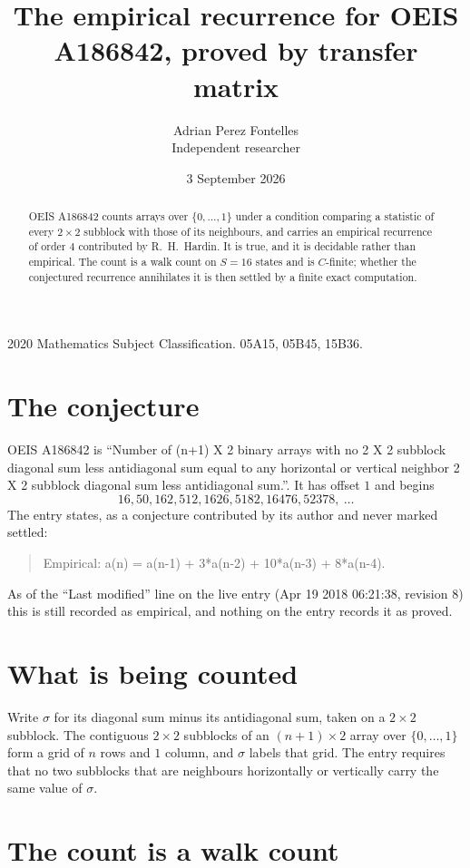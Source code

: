 \documentclass[11pt,a4paper]{article}
\title{The empirical recurrence for OEIS A186842, proved by transfer matrix}
\author{Adrian Perez Fontelles\\ \small Independent researcher}
\date{3 September 2026}
\theoremstyle{plain}
\theoremstyle{definition}
\begin{document}
\maketitle

\begin{abstract}
OEIS A186842 counts arrays over $\{0,\dots,1\}$ under a condition comparing a statistic of
every $2\times2$ subblock with those of its neighbours, and carries an empirical recurrence
of order $4$ contributed by R.~H.~Hardin. It is true, and it is decidable rather than
empirical. The count is a walk count on $S=16$ states and is $C$-finite; whether the
conjectured recurrence annihilates it is then settled by a finite exact computation.
\end{abstract}

\noindent\small 2020 Mathematics Subject Classification. 05A15, 05B45, 15B36.\normalsize

\section{The conjecture}

OEIS A186842 is ``Number of (n+1) X 2 binary arrays with no 2 X 2 subblock diagonal sum less antidiagonal sum equal to any horizontal or vertical neighbor 2 X 2 subblock diagonal sum less antidiagonal sum.''. It has offset $1$ and begins
\[
16, 50, 162, 512, 1626, 5182, 16476, 52378,\ \dots
\]
The entry states, as a conjecture contributed by its author and never marked settled:
\begin{quote}
Empirical: a(n) = a(n-1) + 3*a(n-2) + 10*a(n-3) + 8*a(n-4).
\end{quote}
As of the ``Last modified'' line on the live entry (Apr 19 2018 06:21:38, revision 8) this is still
recorded as empirical, and nothing on the entry records it as proved.

\section{What is being counted}

Write $\sigma$ for its diagonal sum minus its antidiagonal sum, taken on a $2\times2$ subblock. The contiguous $2\times2$
subblocks of an $(n+1)\times2$ array over $\{0,\dots,1\}$ form a grid of $n$ rows
and $1$ column, and $\sigma$ labels that grid. The entry
requires that no two subblocks that are neighbours horizontally or vertically carry the same value of $\sigma$.

\section{The count is a walk count}
\end{document}
